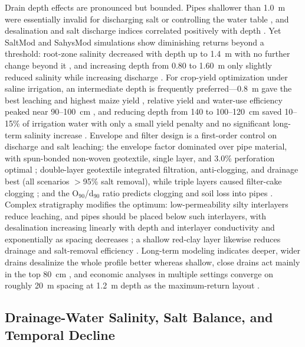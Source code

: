 \documentclass[11pt]{article}
\begin{document}
Drain depth effects are pronounced but bounded. Pipes shallower than 1.0~m were essentially invalid for discharging salt or controlling the water table \parencite{Qian2021b}, and desalination and salt discharge indices correlated positively with depth \parencite{Qian2021b,Tian2023c,Tian2024}. Yet SaltMod and SahysMod simulations show diminishing returns beyond a threshold: root-zone salinity decreased with depth up to 1.4~m with no further change beyond it \parencite{Bahçeci2007}, and increasing depth from 0.80 to 1.60~m only slightly reduced salinity while increasing discharge \parencite{Bahçeci2006}. For crop-yield optimization under saline irrigation, an intermediate depth is frequently preferred---0.8~m gave the best leaching and highest maize yield \parencite{Feng2017}, relative yield and water-use efficiency peaked near 90--100~cm \parencite{Feng2019}, and reducing depth from 140 to 100--120~cm saved 10--15\% of irrigation water with only a small yield penalty and no significant long-term salinity increase \parencite{Muhammad2021}. Envelope and filter design is a first-order control on discharge and salt leaching: the envelope factor dominated over pipe material, with spun-bonded non-woven geotextile, single layer, and 3.0\% perforation optimal \parencite{Li2022}; double-layer geotextile integrated filtration, anti-clogging, and drainage best (all scenarios $>$95\% salt removal), while triple layers caused filter-cake clogging \parencite{Wang2024d}; and the O$_{90}$/d$_{90}$ ratio predicts clogging and soil loss into pipes \parencite{Elzoghby2021}. Complex stratigraphy modifies the optimum: low-permeability silty interlayers reduce leaching, and pipes should be placed below such interlayers, with desalination increasing linearly with depth and interlayer conductivity and exponentially as spacing decreases \parencite{Guo2024b}; a shallow red-clay layer likewise reduces drainage and salt-removal efficiency \parencite{Tian2024}. Long-term modeling indicates deeper, wider drains desalinize the whole profile better whereas shallow, close drains act mainly in the top 80~cm \parencite{KAMRA1991}, and economic analyses in multiple settings converge on roughly 20~m spacing at 1.2~m depth as the maximum-return layout \parencite{Chen2025}.

\subsection{Drainage-Water Salinity, Salt Balance, and Temporal Decline}
\end{document}
